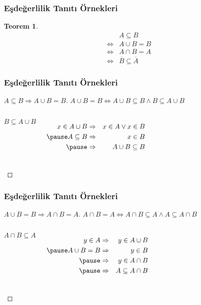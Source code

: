 \documentclass[dvipsnames]{beamer}
\theoremstyle{definition}
\theoremstyle{example}
\theoremstyle{plain}
\newtheorem{teorem}[theorem]{Teorem}
\begin{document}
\begin{frame}
  \frametitle{Eşdeğerlilik Tanıtı Örnekleri}

  \begin{teorem}
    \begin{eqnarray*}
      &                 & A \subseteq B\\
      & \Leftrightarrow & A \cup B = B\\
      & \Leftrightarrow & A \cap B = A\\
      & \Leftrightarrow & \overline{B} \subseteq \overline{A}
    \end{eqnarray*}
  \end{teorem}
\end{frame}

\begin{frame}
  \frametitle{Eşdeğerlilik Tanıtı Örnekleri}

  \begin{proof}[$A \subseteq B \Rightarrow A \cup B = B$]
    $A \cup B = B \Leftrightarrow
      A \cup B \subseteq B \wedge B \subseteq A \cup B$

    \pause
    \bigskip
    \begin{columns}
      $B \subseteq A \cup B$

      \pause
      \medskip
      \begin{eqnarray*}
        x \in A \cup B & \Rightarrow & x \in A \vee x \in B\\\pause
        A \subseteq B  & \Rightarrow & x \in B\\\pause
                       & \Rightarrow & A \cup B \subseteq B
      \end{eqnarray*}
    \end{columns}
  \end{proof}
\end{frame}

\begin{frame}
  \frametitle{Eşdeğerlilik Tanıtı Örnekleri}

  \begin{proof}[$A \cup B = B \Rightarrow A \cap B = A$]
    $A \cap B = A \Leftrightarrow
      A \cap B \subseteq A \wedge A \subseteq A \cap B$

    \pause
    \bigskip
    \begin{columns}
      $A \cap B \subseteq A$

      \pause
      \medskip
      \begin{eqnarray*}
        y \in A      & \Rightarrow & y \in A \cup B\\\pause
        A \cup B = B & \Rightarrow & y \in B\\\pause
                     & \Rightarrow & y \in A \cap B\\\pause
                     & \Rightarrow & A \subseteq A \cap B
      \end{eqnarray*}
    \end{columns}
  \end{proof}
\end{frame}
\end{document}
